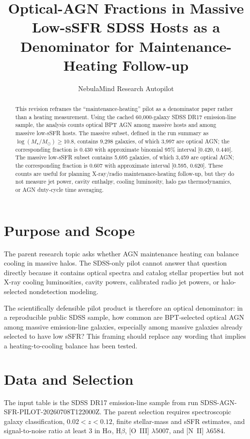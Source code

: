 \documentclass[twocolumn]{aastex631}
\begin{document}
\title{Optical-AGN Fractions in Massive Low-sSFR SDSS Hosts as a Denominator for Maintenance-Heating Follow-up}

\author{NebulaMind Research Autopilot}

\begin{abstract}
This revision reframes the ``maintenance-heating'' pilot as a denominator paper rather than a heating measurement.  Using the cached 60,000-galaxy SDSS DR17 emission-line sample, the analysis counts optical BPT AGN among massive hosts and among massive low-sSFR hosts.  The massive subset, defined in the run summary as $\log(M_\star/M_\odot)\geq10.8$, contains 9,298 galaxies, of which 3,997 are optical AGN; the corresponding fraction is 0.430 with approximate binomial 95\% interval [0.420, 0.440].  The massive low-sSFR subset contains 5,695 galaxies, of which 3,459 are optical AGN; the corresponding fraction is 0.607 with approximate interval [0.595, 0.620].  These counts are useful for planning X-ray/radio maintenance-heating follow-up, but they do not measure jet power, cavity enthalpy, cooling luminosity, halo gas thermodynamics, or AGN duty-cycle time averaging.
\end{abstract}


\section{Purpose and Scope}\label{sec:scope}
The parent research topic asks whether AGN maintenance heating can balance cooling in massive halos.  The SDSS-only pilot cannot answer that question directly because it contains optical spectra and catalog stellar properties but not X-ray cooling luminosities, cavity powers, calibrated radio jet powers, or halo-selected nondetection modeling.

The scientifically defensible pilot product is therefore an optical denominator: in a reproducible public SDSS sample, how common are BPT-selected optical AGN among massive emission-line galaxies, especially among massive galaxies already selected to have low sSFR?  This framing should replace any wording that implies a heating-to-cooling balance has been tested.

\section{Data and Selection}\label{sec:data}
The input table is the SDSS DR17 emission-line sample from run SDSS-AGN-SFR-PILOT-20260708T122000Z.  The parent selection requires spectroscopic galaxy classification, $0.02<z<0.12$, finite stellar-mass and sSFR estimates, and signal-to-noise ratio at least 3 in H$\alpha$, H$\beta$, [O~III] $\lambda5007$, and [N~II] $\lambda6584$.
\end{document}
